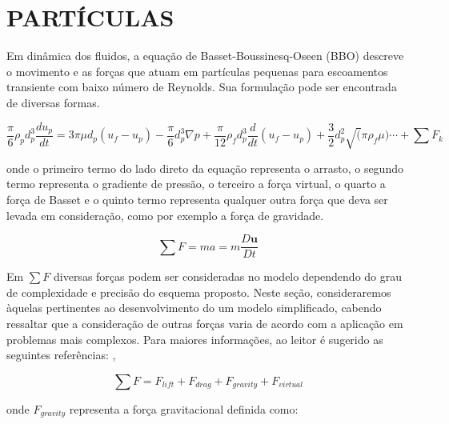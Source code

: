 \typeout{ ====================================================================}
\typeout{ ====================================================================}

\section{PARTÍCULAS}

Em dinâmica dos fluidos, a equação de Basset-Boussinesq-Oseen (BBO)
descreve o movimento e as forças que atuam em partículas pequenas para
escoamentos transiente com baixo número de Reynolds. Sua formulação pode
ser encontrada de diversas formas. 

\begin{equation}
	\frac{\pi}{6} \rho_p d_p^3 \frac{du_p}{dt} 
	=
	3 \pi \mu d_p (u_f-u_p)
	-
	\frac{\pi}{6} d_p^3 \nabla p
	+
	\frac{\pi}{12} \rho_f d_p^3 \frac{d}{dt}(u_f-u_p)
	+
	\frac{3}{2} d_p^2 \sqrt(\pi \rho_f \mu) \cdots
	+
	\sum F_k
\end{equation}

\noindent onde o primeiro termo do lado direto da equação representa o
arrasto, o segundo termo representa o gradiente de pressão, o terceiro
a força virtual, o quarto a força de Basset e o quinto termo representa
qualquer outra força que deva ser levada em consideração, como por
exemplo a força de gravidade.

\begin{equation}
	\sum F = ma = m \frac{D \mathbf{u}}{D t}
\end{equation}

Em $\sum F$ diversas forças podem ser consideradas no modelo dependendo
do grau de complexidade e precisão do esquema proposto. Neste seção,
consideraremos àquelas pertinentes ao desenvolvimento do um modelo
simplificado, cabendo ressaltar que a consideração de outras forças
varia de acordo com a aplicação em problemas mais complexos. Para
maiores informações, ao leitor é sugerido as seguintes referências:
\cite{crowe2012}, 

\begin{equation}
	\sum F = F_{lift} + F_{drag} + F_{gravity} + F_{virtual}
\end{equation}

\noindent onde $F_{gravity}$ representa a força gravitacional definida
como: 

